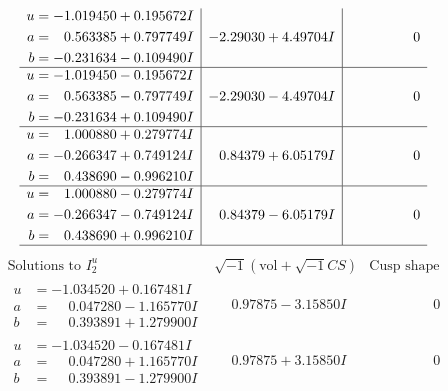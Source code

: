 \documentclass[1p]{elsarticle_modified}
\theoremstyle{definition}
\newcommand{\I}{\sqrt{-1}}
\begin{document}
$$\begin{array}{c|c|c}
\begin{aligned}
u &= -1.019450 + 0.195672 I \\
a &= \phantom{-}0.563385 + 0.797749 I \\
b &= -0.231634 - 0.109490 I\end{aligned}
 & -2.29030 + 4.49704 I & \phantom{-0.000000 } 0 \\ \hline\begin{aligned}
u &= -1.019450 - 0.195672 I \\
a &= \phantom{-}0.563385 - 0.797749 I \\
b &= -0.231634 + 0.109490 I\end{aligned}
 & -2.29030 - 4.49704 I & \phantom{-0.000000 } 0 \\ \hline\begin{aligned}
u &= \phantom{-}1.000880 + 0.279774 I \\
a &= -0.266347 + 0.749124 I \\
b &= \phantom{-}0.438690 - 0.996210 I\end{aligned}
 & \phantom{-}0.84379 + 6.05179 I & \phantom{-0.000000 } 0 \\ \hline\begin{aligned}
u &= \phantom{-}1.000880 - 0.279774 I \\
a &= -0.266347 - 0.749124 I \\
b &= \phantom{-}0.438690 + 0.996210 I\end{aligned}
 & \phantom{-}0.84379 - 6.05179 I & \phantom{-0.000000 } 0\\
 \hline 
 \end{array}$$\newpage$$\begin{array}{c|c|c}  
\text{Solutions to }I^u_{2}& \I (\text{vol} + \sqrt{-1}CS) & \text{Cusp shape}\\
 \hline 
\begin{aligned}
u &= -1.034520 + 0.167481 I \\
a &= \phantom{-}0.047280 - 1.165770 I \\
b &= \phantom{-}0.393891 + 1.279900 I\end{aligned}
 & \phantom{-}0.97875 - 3.15850 I & \phantom{-0.000000 } 0 \\ \hline\begin{aligned}
u &= -1.034520 - 0.167481 I \\
a &= \phantom{-}0.047280 + 1.165770 I \\
b &= \phantom{-}0.393891 - 1.279900 I\end{aligned}
 & \phantom{-}0.97875 + 3.15850 I & \phantom{-0.000000 } 0 \\ \hline\begin{aligned}

\end{aligned}
\end{array}$$
\end{document}
